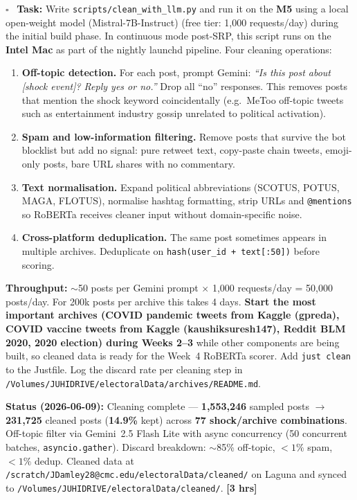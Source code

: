 \documentclass[11pt]{article}
\newcommand{\hrs}[1]{\textbf{[#1 hrs]}}
\newcommand{\task}[2]{%
  \noindent\textbf{Task:} #1 \hfill \hrs{#2}\\}
\newcommand{\done}{\textcolor{sectionblue}{$\square$}\ }
\begin{document}
\begin{taskbox}
\done \task{Write \texttt{scripts/clean\_with\_llm.py} and run it on the
  \textbf{M5} using a local open-weight model (Mistral-7B-Instruct)
  (free tier: 1,000 requests/day) during the initial build phase. In
  continuous mode post-SRP, this script runs on the \textbf{Intel Mac}
  as part of the nightly launchd pipeline. Four cleaning operations:

  \begin{enumerate}[leftmargin=1.6em, itemsep=1pt]
    \item \textbf{Off-topic detection.} For each post, prompt Gemini:
          \textit{``Is this post about [shock event]? Reply yes or no.''}
          Drop all ``no'' responses. This removes posts that mention the
          shock keyword coincidentally (e.g.\ MeToo off-topic tweets
          such as entertainment industry gossip unrelated to political activation).
    \item \textbf{Spam and low-information filtering.} Remove posts that
          survive the bot blocklist but add no signal: pure retweet text,
          copy-paste chain tweets, emoji-only posts, bare URL shares with
          no commentary.
    \item \textbf{Text normalisation.} Expand political abbreviations
          (SCOTUS, POTUS, MAGA, FLOTUS), normalise hashtag formatting,
          strip URLs and \texttt{@mentions} so RoBERTa receives cleaner
          input without domain-specific noise.
    \item \textbf{Cross-platform deduplication.} The same post sometimes
          appears in multiple archives. Deduplicate on
          \texttt{hash(user\_id + text[:50])} before scoring.
  \end{enumerate}

  \textbf{Throughput:} $\sim$50 posts per Gemini prompt $\times$ 1,000 requests/day
  = 50,000 posts/day. For 200k posts per archive this takes 4 days.
  \textbf{Start the most important archives (COVID pandemic tweets from Kaggle (gpreda), COVID vaccine tweets from Kaggle (kaushiksuresh147), Reddit BLM 2020, 2020 election) during
  Weeks 2--3} while other components are being built, so cleaned data is
  ready for the Week~4 RoBERTa scorer. Add \texttt{just clean} to the
  Justfile. Log the discard rate per cleaning step in
  \texttt{/Volumes/JUHIDRIVE/electoralData/archives/README.md}.

  \textbf{Status (2026-06-09):} Cleaning complete ---
  \textbf{1,553,246} sampled posts $\to$ \textbf{231,725} cleaned posts
  (\textbf{14.9\%} kept) across \textbf{77 shock/archive combinations}.
  Off-topic filter via Gemini~2.5 Flash Lite with async concurrency
  (50 concurrent batches, \texttt{asyncio.gather}). Discard breakdown:
  $\sim$85\% off-topic, ${<}1\%$ spam, ${<}1\%$ dedup. Cleaned data at
  \texttt{/scratch/JDamley28@cmc.edu/electoralData/cleaned/} on Laguna
  and synced to \texttt{/Volumes/JUHIDRIVE/electoralData/cleaned/}.}{3}


\end{taskbox}
\end{document}
